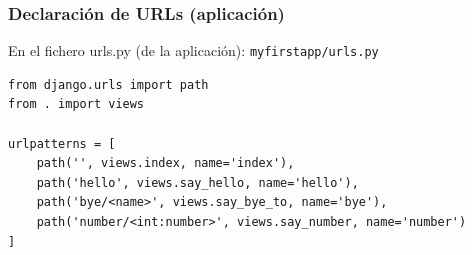 \begin{frame}[fragile]
\frametitle{Declaración de URLs (aplicación)}

En el fichero urls.py (de la aplicación): \verb|myfirstapp/urls.py|

\begin{verbatim}
from django.urls import path
from . import views

urlpatterns = [
    path('', views.index, name='index'),
    path('hello', views.say_hello, name='hello'),
    path('bye/<name>', views.say_bye_to, name='bye'),
    path('number/<int:number>', views.say_number, name='number')
]
\end{verbatim}

\end{frame}





